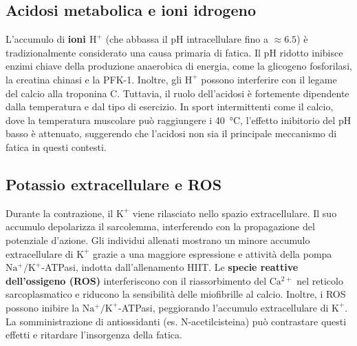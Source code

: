 \documentclass[12pt,a4paper]{report}
\begin{document}
\subsection{Acidosi metabolica e ioni idrogeno}
L'accumulo di \textbf{ioni \(\mathrm{H^+}\)} (che abbassa il pH intracellulare fino a \(\approx 6.5\)) è tradizionalmente considerato una causa primaria di fatica. Il pH ridotto inibisce enzimi chiave della produzione anaerobica di energia, come la glicogeno fosforilasi, la creatina chinasi e la PFK-1. Inoltre, gli \(\mathrm{H^+}\) possono interferire con il legame del calcio alla troponina C.
Tuttavia, il ruolo dell'acidosi è fortemente dipendente dalla temperatura e dal tipo di esercizio. In sport intermittenti come il calcio, dove la temperatura muscolare può raggiungere i \SI{40}{\celsius}, l'effetto inibitorio del pH basso è attenuato, suggerendo che l'acidosi non sia il principale meccanismo di fatica in questi contesti.

\subsection{Potassio extracellulare e ROS}
Durante la contrazione, il \(\mathrm{K^+}\) viene rilasciato nello spazio extracellulare. Il suo accumulo depolarizza il sarcolemma, interferendo con la propagazione del potenziale d'azione. Gli individui allenati mostrano un minore accumulo extracellulare di \(\mathrm{K^+}\) grazie a una maggiore espressione e attività della pompa \(\mathrm{Na^+/K^+}\)-ATPasi, indotta dall'allenamento HIIT.
Le \textbf{specie reattive dell'ossigeno (ROS)} interferiscono con il riassorbimento del \(\mathrm{Ca^{2+}}\) nel reticolo sarcoplasmatico e riducono la sensibilità delle miofibrille al calcio. Inoltre, i ROS possono inibire la \(\mathrm{Na^+/K^+}\)-ATPasi, peggiorando l'accumulo extracellulare di \(\mathrm{K^+}\). La somministrazione di antiossidanti (es. N-acetilcisteina) può contrastare questi effetti e ritardare l'insorgenza della fatica.
\end{document}
